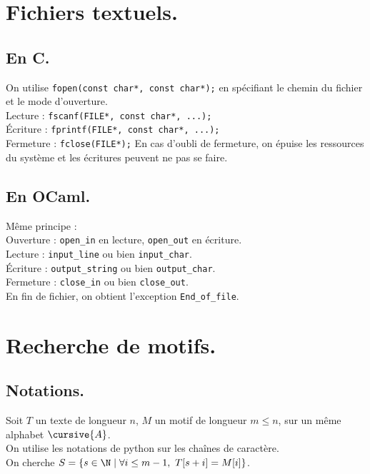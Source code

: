 \documentclass[french, 11pt]{article}
\begin{document}
\section{Fichiers textuels.}
\subsection{En C.}

\begin{defi}{}{}
    On utilise \texttt{fopen(const char*, const char*);} en spécifiant le chemin du fichier et le mode d'ouverture.\\
    Lecture : \texttt{fscanf(FILE*, const char*, ...);}\\
    Écriture : \texttt{fprintf(FILE*, const char*, ...);}\\
    Fermeture : \texttt{fclose(FILE*);}\n
    En cas d'oubli de fermeture, on épuise les ressources du système et les écritures peuvent ne pas se faire. 
\end{defi}

\subsection{En OCaml.}

\begin{defi}{}{}
    Même principe :\\
    Ouverture : \texttt{open\_in} en lecture, \texttt{open\_out} en écriture.\\
    Lecture : \texttt{input\_line} ou bien \texttt{input\_char}.\\
    Écriture : \texttt{output\_string} ou bien \texttt{output\_char}.\\
    Fermeture : \texttt{close\_in} ou bien \texttt{close\_out}.\\
    En fin de fichier, on obtient l'exception \texttt{End\_of\_file}.
\end{defi}

\section{Recherche de motifs.}
\subsection{Notations.}

\begin{nota}{}{}
    Soit $T$ un texte de longueur $n$, $M$ un motif de longueur $m\leq n$, sur un même alphabet $\cursive{A}$.\\
    On utilise les notations de python sur les chaînes de caractère.\\
    On cherche $S=\{s\in\N \mid \forall i \leq m-1, ~ T[s+i]=M[i]\}$.
\end{nota}
\end{document}
